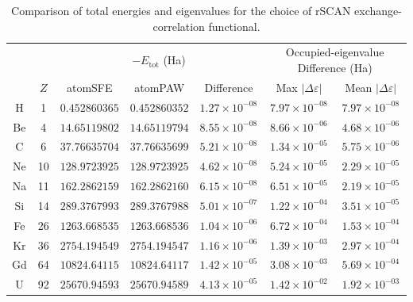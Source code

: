 \begin{table}[!htbp]
    \centering
    \footnotesize
    \setlength{\tabcolsep}{3pt}
    \caption{Comparison of total energies and eigenvalues for the choice of rSCAN exchange-correlation functional.}
    \label{tab:ae-acc-rscan-rep10}
    \begin{tabular}{@{}c c ccc cc@{}}
        \toprule
        & & \multicolumn{3}{c}{$-E_{\mathrm{tot}}$ (Ha)} & \multicolumn{2}{c}{Occupied-eigenvalue Difference (Ha)} \\
        \cmidrule(lr){3-5} \cmidrule(lr){6-7}
        & $Z$ & atomSFE & atomPAW & Difference & Max $|\Delta \varepsilon|$ & Mean $|\Delta \varepsilon|$ \\
        \midrule
        H  &  1 & $0.452860365$   & $0.452860352$   & $1.27\times10^{-08}$ & $7.97\times10^{-08}$ & $7.97\times10^{-08}$ \\
        Be &  4 & $14.65119802$   & $14.65119794$   & $8.55\times10^{-08}$ & $8.66\times10^{-06}$ & $4.68\times10^{-06}$ \\
        C  &  6 & $37.76635704$   & $37.76635699$   & $5.21\times10^{-08}$ & $1.34\times10^{-05}$ & $5.75\times10^{-06}$ \\
        Ne & 10 & $128.9723925$   & $128.9723925$   & $4.62\times10^{-08}$ & $5.24\times10^{-05}$ & $2.29\times10^{-05}$ \\
        Na & 11 & $162.2862159$   & $162.2862160$   & $6.15\times10^{-08}$ & $6.51\times10^{-05}$ & $2.19\times10^{-05}$ \\
        Si & 14 & $289.3767993$   & $289.3767988$   & $5.01\times10^{-07}$ & $1.22\times10^{-04}$ & $3.51\times10^{-05}$ \\
        Fe & 26 & $1263.668535$   & $1263.668536$   & $1.04\times10^{-06}$ & $6.72\times10^{-04}$ & $1.53\times10^{-04}$ \\
        Kr & 36 & $2754.194549$   & $2754.194547$   & $1.16\times10^{-06}$ & $1.39\times10^{-03}$ & $2.97\times10^{-04}$ \\
        Gd & 64 & $10824.64115$   & $10824.64117$   & $1.42\times10^{-05}$ & $3.08\times10^{-03}$ & $5.69\times10^{-04}$ \\
        U  & 92 & $25670.94593$   & $25670.94589$   & $4.13\times10^{-05}$ & $1.42\times10^{-02}$ & $1.92\times10^{-03}$ \\
        \bottomrule
    \end{tabular}
\end{table}


